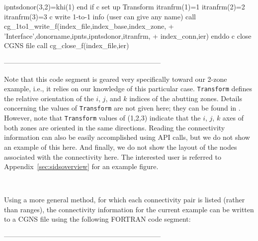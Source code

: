 \documentclass[12pt]{article}
\begin{document}
{\newline\indent\indent\indent      ipntsdonor(3,2)=khi(1)
\newline\indent\indent   end if
\newline c   set up Transform
\newline\indent\indent      itranfrm(1)=1
\newline\indent\indent      itranfrm(2)=2
\newline\indent\indent      itranfrm(3)=3
\newline c   write 1-to-1 info (user can give any name)
\newline\indent\indent   call cg\_1to1\_write\_f(index\_file,index\_base,index\_zone,
\newline\indent + \indent 'Interface',donorname,ipnts,ipntsdonor,itranfrm,
\newline\indent + \indent index\_conn,ier)
\newline\indent      enddo
\newline c  close CGNS file
\newline\indent      call cg\_close\_f(index\_file,ier)}

--------------------------------------------------------------------

\noindent Note that this code segment is geared very specifically 
toward our 2-zone example, i.e., it relies on our
knowledge of this particular case.  {\tt Transform} defines the
relative orientation of the $i$, $j$, and $k$ indices of the
abutting zones.  Details concerning the
values of {\tt Transform} are not given here; they can be found in
\cite{ALLMARAS}.  However, note that {\tt Transform} values of 
(1,2,3) indicate that the $i$, $j$, $k$ axes of both zones
are oriented in the same directions.  Reading the connectivity information 
can also be easily accomplished using
API calls, but we do not show an example of this here.
And finally, we do not show the layout of the nodes associated with
the connectivity here.  The interested user is referred to 
Appendix~\ref{sec:sidsoverview} for an example figure.

~

\noindent{}

Using a more general method, for which each connectivity pair is
listed (rather than ranges),
the connectivity information for the current example
can be written to a CGNS file using the following
FORTRAN code segment:

--------------------------------------------------------------------
\end{document}
